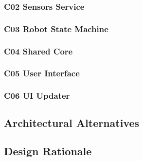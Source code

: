 \subsubsection{C02 Sensors Service}

\subsubsection{C03 Robot State Machine}

\subsubsection{C04 Shared Core}

\subsubsection{C05 User Interface}

\subsubsection{C06 UI Updater}

\subsection{Architectural Alternatives}
\subsection{Design Rationale}
